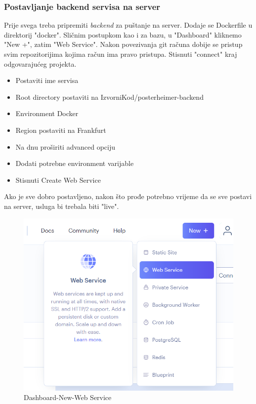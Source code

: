 			\newpage
			\subsubsection{Postavljanje backend servisa na server}
			Prije svega treba pripremiti \textit{backend} za puštanje na server. Dodaje se Dockerfile u direktorij "docker". Sličnim postupkom kao i za bazu, u "Dashboard" kliknemo "New +", zatim "Web Service". Nakon povezivanja git računa dobije se pristup svim repozitorijima kojima račun ima pravo pristupa. Stisnuti "connect" kraj odgovarajućeg projekta.
			\begin{itemize}
			\item Postaviti ime servisa
			\item Root directory postaviti na IzvorniKod/posterheimer-backend
			\item Environment Docker
			\item Region postaviti na Frankfurt
			\item Na dnu proširiti advanced opciju
			\item Dodati potrebne environment varijable
			\item Stisnuti Create Web Service
			\end{itemize}
			Ako je sve dobro postavljeno, nakon što prođe potrebno vrijeme da se sve postavi na server, usluga bi trebala biti "live". 
			
			\begin{figure} [H]
				\includegraphics[width=\linewidth]{Slike/Dashboard-New-Web Service}
				\caption{Dashboard-New-Web Service }
			\end{figure}
			
